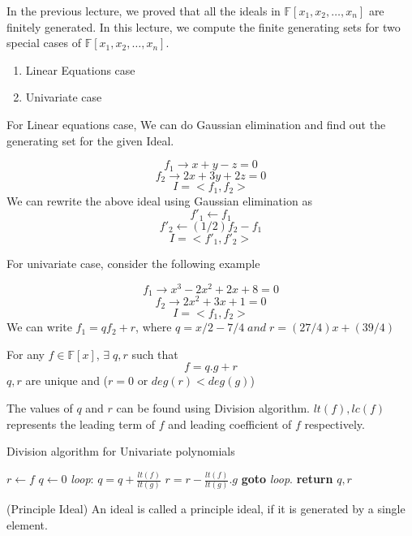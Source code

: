 In the previous lecture, we proved that all the ideals in $\mathbb{F}[x_1,x_2,\ldots,x_n]$ are finitely generated. In this lecture, we compute the finite generating sets for two special cases of $\mathbb{F}[x_1,x_2,\ldots,x_n]$.
\begin{enumerate}
\item Linear Equations case
\item Univariate case
\end{enumerate}
For Linear equations case, We can do Gaussian elimination and find out the generating set for the given Ideal.
\begin{example}
$$f_1 \rightarrow x+y-z=0$$
$$f_2 \rightarrow 2x+3y+2z=0$$
$$I=<f_1,f_2>$$
We can rewrite the above ideal using Gaussian elimination as 
$$f'_1 \leftarrow f_1$$
$$f'_2 \leftarrow (1/2)f_2-f_1$$
$$I=<f'_1,f'_2>$$
\end{example}
For univariate case, consider the following example
\begin{example}
$$f_1 \rightarrow x^3-2x^2+2x+8=0$$
$$f_2 \rightarrow 2x^2+3x+1=0$$
$$I=<f_1,f_2>$$
We can write $f_1 = qf_2+r$, where $q=x/2 - 7/4\;and \; r=(27/4)x+(39/4)$\\
\end{example}
\begin{lemma}
For any $f\in \mathbb{F}[x]$, $\exists\;q,r $ such that $$ f=q.g+r $$
$q,r$ are unique and ($r=0$ or $deg(r)<deg(g)$)
\end{lemma}
The values of $q$ and $r$ can be found using Division algorithm. $lt(f),lc(f)$ represents the leading term of $f$ and leading coefficient of $f$ respectively.
\begin{algorithm}
\caption{Division algorithm for Univariate polynomials}\label{euclid}
\begin{algorithmic}[1]
\State $r \leftarrow f$
\State $q \leftarrow 0$
\State \emph{loop}:
\State $q = q + \frac{lt(f)}{lt(g)}$
\State $r=r-\frac{lt(f)}{lt(g)}.g$
\State \textbf{goto} \emph{loop}.
\EndIf
\State \textbf{return} $q,r$
\EndProcedure
\end{algorithmic}
\end{algorithm}
\begin{definition}(Principle Ideal)
An ideal is called a principle ideal, if it is generated by a single element.
\end{definition}

